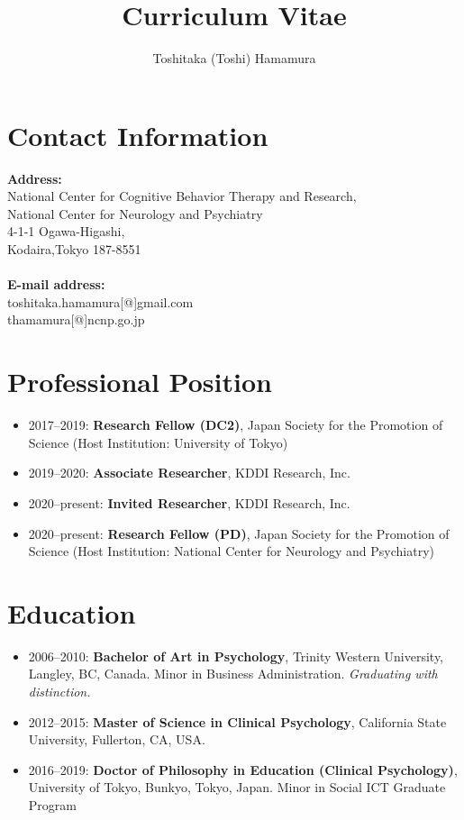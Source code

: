 \documentclass{article}
\begin{document}
\sloppy
\title{Curriculum Vitae}
\author{Toshitaka (Toshi) Hamamura}
\maketitle

\section{Contact Information}
\textbf{Address:}\\ 
National Center for Cognitive Behavior Therapy and Research,\\
National Center for Neurology and Psychiatry\\
4-1-1 Ogawa-Higashi,\\
Kodaira,Tokyo 187-8551\\
\\
\textbf{E-mail address:}\\	
toshitaka.hamamura[@]gmail.com\\
thamamura[@]ncnp.go.jp\\

\section{Professional Position}
\begin{itemize}
	\item 2017--2019: \textbf{Research Fellow (DC2)}, Japan Society for the Promotion of Science (Host Institution: University of Tokyo)
	\item 2019--2020: \textbf{Associate Researcher}, KDDI Research, Inc.
	\item 2020--present: \textbf{Invited Researcher}, KDDI Research, Inc.
	\item 2020--present: \textbf{Research Fellow (PD)}, Japan Society for the Promotion of Science (Host Institution: National Center for Neurology and Psychiatry)
\end{itemize}

\section{Education}
\begin{itemize}
	\item 2006--2010: \textbf{Bachelor of Art in Psychology}, Trinity Western University, Langley, BC, Canada. Minor in Business Administration. \textit{Graduating with distinction.}
	\item 2012--2015: \textbf{Master of Science in Clinical Psychology}, California State University, Fullerton, CA, USA. 
	\item 2016--2019: \textbf{Doctor of Philosophy in Education (Clinical Psychology)}, University of Tokyo, Bunkyo, Tokyo, Japan. Minor in Social ICT Graduate Program
\end{itemize}
\end{document}
